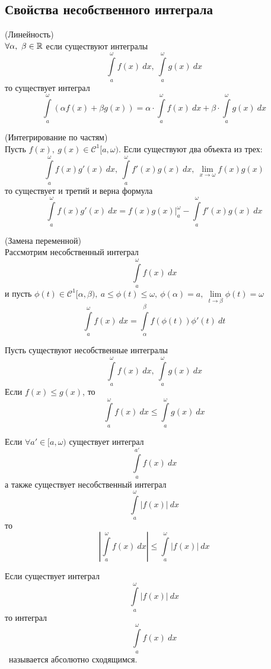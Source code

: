 \subsection{Свойства несобственного интеграла}
\setcounter{thmcount}{0}
\begin{numtheorem}
    (Линейность)\\
    $\forall \alpha,\ \beta\in \mathbb{R}$ если существуют интегралы
    \[\int\limits_{a}^{\omega}f(x)\ dx,\ \int\limits_{a}^{\omega}g(x)\ dx\]
    то существует интеграл
    \[\int\limits_{a}^{\omega}(\alpha f(x)+\beta g(x))=\alpha\cdot \int\limits_{a}^{\omega}f(x)\ dx+\beta\cdot \int\limits_{a}^{\omega}g(x)\ dx\]
\end{numtheorem}
\begin{numtheorem}
    (Интегрирование по частям)\\
    Пусть $f(x),\ g(x)\in \mathcal{C}^1[a,\omega)$. Если существуют два объекта из трех:
    \[\int\limits_{a}^{\omega} f(x)g'(x)\ dx,\ \int\limits_{a}^{\omega}f'(x)g(x)\ dx,\ \lim\limits_{x\to \omega}f(x)g(x)\]
    то существует и третий и верна формула
    \[\int\limits_{a}^{\omega}f(x)g'(x)\ dx=f(x)g(x)|_a^{\omega}-\int\limits_{a}^{\omega}f'(x)g(x)\ dx\]
\end{numtheorem}  
\begin{numtheorem}
    (Замена переменной)\\
    Рассмотрим несобственный интеграл 
    \[\int\limits_{a}^{\omega}f(x)\ dx\]
    и пусть $\phi(t)\in \mathcal{C}^1[\alpha,\beta),\ a\leq \phi(t)\leq \omega,\ \phi(\alpha)=a,\ \lim\limits_{t\to \beta}\phi(t)=\omega$
    \[\int\limits_{a}^{\omega}f(x)\ dx=\int\limits_{\alpha}^{\beta} f(\phi(t))\phi'(t)\ dt\]
\end{numtheorem} 
\begin{numtheorem}
    Пусть существуют несобственные интегралы
    \[\int\limits_{a}^{\omega}f(x)\ dx,\ \int\limits_{a}^{\omega}g(x)\ dx\]
    Если $f(x)\leq g(x)$, то
    \[\int\limits_{a}^{\omega}f(x)\ dx\leq \int\limits_{a}^{\omega}g(x)\ dx\]
\end{numtheorem} 
\begin{numtheorem}
    Если $\forall a'\in [a, \omega)$ существует интеграл
    \[\int\limits_{a}^{a'}f(x)\ dx\]
    а также существует несобственный интеграл
    \[\int\limits_{a}^{\omega}|f(x)|\ dx\]
    то
    \[\left|\int\limits_{a}^{\omega}f(x)\ dx\right|\leq \int\limits_{a}^{\omega}|f(x)|\ dx\]
\end{numtheorem} 
\begin{definition}
    Если существует интеграл
    \[\int\limits_{a}^{\omega}|f(x)|\ dx\]
    то интеграл
    \[\int\limits_{a}^{\omega}f(x)\ dx\]\
    называется абсолютно сходящимся.
\end{definition} 
